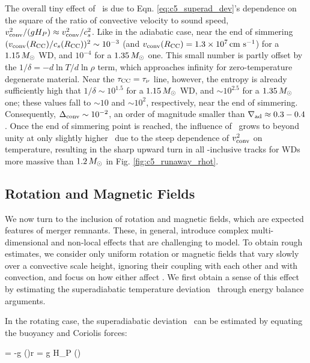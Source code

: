 The overall tiny effect of \dnabconv\ is due to Eqn. \ref{eq:c5_superad_dev}'s dependence on the square of the ratio of convective velocity to sound speed, $\vconv^2/(g H_P) \approx \vconv^2/c_s^2$.  Like in the adiabatic case, near the end of simmering $(\vconvrcc/c_s(\Rcc))^2 \sim 10^{-3}$ (and $\vconvrcc = 1.3\times10^7\,\cmpsec$) for a $1.15\,\Msun$ WD, and $10^{-4}$ for a $1.35\,\Msun$ one.  This small number is partly offset by the $1/\delta = -d\ln T/d\ln \rho$ term, which approaches infinity for zero-temperature degenerate material.  Near the $\taucc = \taunu$ line, however, the entropy is already sufficiently high that $1/\delta \sim 10^{1.5}$ for a $1.15\,\Msun$ WD, and $\sim 10^{2.5}$ for a $1.35\,\Msun$ one; these values fall to $\sim 10$ and $\sim 10^2$, respectively, near the end of simmering.  Consequently, $\dnabconv \sim 10^{-2}$, an order of magnitude smaller than $\nablaad \approx 0.3 - 0.4$.  Once the end of simmering point is reached, the influence of \dnabconv\ grows to beyond unity at only slightly higher \Sc\ due to the steep dependence of $\vconv^2$ on temperature, resulting in the sharp upward turn in all \dnabconv-inclusive tracks for WDs more massive than $1.2\,\Msun$ in Fig. \ref{fig:c5_runaway_rhot}.

\subsection{Rotation and Magnetic Fields}
\label{ssec:c5_rotmag}


We now turn to the inclusion of rotation and magnetic fields, which are expected features of merger remnants.  These, in general, introduce complex multi-dimensional and non-local effects that are challenging to model.  To obtain rough estimates, we consider only uniform rotation or magnetic fields that vary slowly over a convective scale height, ignoring their coupling with each other and with convection, and focus on how either affect \Mcrit.  We first obtain a sense of this effect by estimating the superadiabatic temperature deviation \deltanab\ through energy balance arguments.

In the rotating case, the superadiabatic deviation \dnabrot\ can be estimated by equating the buoyancy and Coriolis forces:

\rho\Omega\vconv = -g \left(\right)\Delta r = g H_P \rho \left(\dnabrot\right)
\label{eq:c5_dnabrot_est_work}
\eqend

